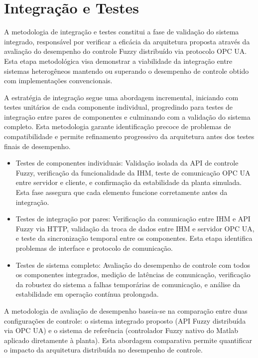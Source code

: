 \section{Integração e Testes}
\label{sec:intetestes}

A metodologia de integração e testes constitui a fase de validação do sistema integrado, responsável por verificar a eficácia da arquitetura proposta através da avaliação do desempenho do controle Fuzzy distribuído via protocolo OPC UA. Esta etapa metodológica visa demonstrar a viabilidade da integração entre sistemas heterogêneos mantendo ou superando o desempenho de controle obtido com implementações convencionais.

A estratégia de integração segue uma abordagem incremental, iniciando com testes unitários de cada componente individual, progredindo para testes de integração entre pares de componentes e culminando com a validação do sistema completo. Esta metodologia garante identificação precoce de problemas de compatibilidade e permite refinamento progressivo da arquitetura antes dos testes finais de desempenho.

\begin{itemize}
\item Testes de componentes individuais: Validação isolada da API de controle Fuzzy, verificação da funcionalidade da IHM, teste de comunicação OPC UA entre servidor e cliente, e confirmação da estabilidade da planta simulada. Esta fase assegura que cada elemento funcione corretamente antes da integração.
\item Testes de integração por pares: Verificação da comunicação entre IHM e API Fuzzy via HTTP, validação da troca de dados entre IHM e servidor OPC UA, e teste da sincronização temporal entre os componentes. Esta etapa identifica problemas de interface e protocolo de comunicação.
\item Testes de sistema completo: Avaliação do desempenho de controle com todos os componentes integrados, medição de latências de comunicação, verificação da robustez do sistema a falhas temporárias de comunicação, e análise da estabilidade em operação contínua prolongada.
\end{itemize}

A metodologia de avaliação de desempenho baseia-se na comparação entre duas configurações de controle: o sistema integrado proposto (API Fuzzy distribuída via OPC UA) e o sistema de referência (controlador Fuzzy nativo do Matlab aplicado diretamente à planta). Esta abordagem comparativa permite quantificar o impacto da arquitetura distribuída no desempenho de controle.


